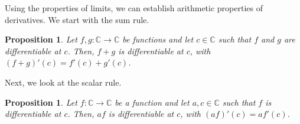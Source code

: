 \documentclass[a4paper, openany]{memoir}
\theoremstyle{definition}
\theoremstyle{plain}
\newtheorem{proposition}[definition]{Proposition}
\begin{document}
Using the properties of limits, we can establish arithmetic properties of derivatives. We start with the sum rule.
\begin{proposition}
Let $f, g: \mathbb{C} \to \mathbb{C}$ be functions and let $c \in \mathbb{C}$ such that $f$ and $g$ are differentiable at $c$. Then, $f+g$ is differentiable at $c$, with $(f+g)'(c) = f'(c) + g'(c)$.
\end{proposition}
\noindent Next, we look at the scalar rule.
\begin{proposition}
Let $f: \mathbb{C} \to \mathbb{C}$ be a function and let $a, c \in \mathbb{C}$ such that $f$ is differentiable at $c$. Then, $af$ is differentiable at $c$, with $(af)'(c) = af'(c)$.
\end{proposition}
\end{document}

